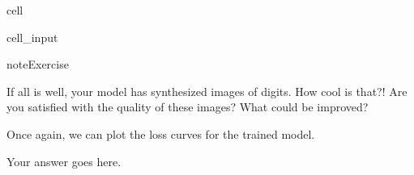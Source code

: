 \documentclass[letterpaper,10pt,english]{jupyterBook}
\begin{document}
\begin{sphinxuseclass}{cell}
\begin{sphinxVerbatimInput}
\begin{sphinxuseclass}{cell_input}
\begin{sphinxVerbatim}[commandchars=\\\{\}]
              
              
               
        
         
          
         
\end{sphinxVerbatim}

\end{sphinxuseclass}\end{sphinxVerbatimInput}

\end{sphinxuseclass}
\begin{sphinxadmonition}{note}{Exercise}

\sphinxAtStartPar
If all is well, your model has synthesized images of digits. How cool is that?! Are you satisfied with the quality of these images? What could be improved?

\sphinxAtStartPar
Once again, we can plot the loss curves for the trained model.
\end{sphinxadmonition}

\sphinxAtStartPar
Your answer goes here.
\end{document}
